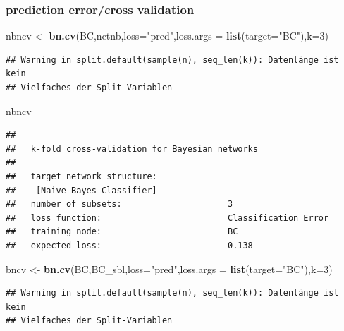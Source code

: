 \documentclass[]{article}
\newenvironment{Shaded}{\begin{snugshade}}{\end{snugshade}}
\newcommand{\KeywordTok}[1]{\textcolor[rgb]{0.13,0.29,0.53}{\textbf{{#1}}}}
\newcommand{\DataTypeTok}[1]{\textcolor[rgb]{0.13,0.29,0.53}{{#1}}}
\newcommand{\DecValTok}[1]{\textcolor[rgb]{0.00,0.00,0.81}{{#1}}}
\newcommand{\StringTok}[1]{\textcolor[rgb]{0.31,0.60,0.02}{{#1}}}
\newcommand{\NormalTok}[1]{{#1}}
\begin{document}
\subsubsection{prediction error/cross
validation}\label{prediction-errorcross-validation}

\begin{Shaded}
\begin{Highlighting}[]
\NormalTok{nbncv <-}\StringTok{ }\KeywordTok{bn.cv}\NormalTok{(BC,netnb,}\DataTypeTok{loss=}\StringTok{"pred"}\NormalTok{,}\DataTypeTok{loss.args =} \KeywordTok{list}\NormalTok{(}\DataTypeTok{target=}\StringTok{"BC"}\NormalTok{),}\DataTypeTok{k=}\DecValTok{3}\NormalTok{)}
\end{Highlighting}
\end{Shaded}

\begin{verbatim}
## Warning in split.default(sample(n), seq_len(k)): Datenlänge ist kein
## Vielfaches der Split-Variablen
\end{verbatim}

\begin{Shaded}
\begin{Highlighting}[]
\NormalTok{nbncv}
\end{Highlighting}
\end{Shaded}

\begin{verbatim}
## 
##   k-fold cross-validation for Bayesian networks
## 
##   target network structure:
##    [Naive Bayes Classifier]
##   number of subsets:                     3 
##   loss function:                         Classification Error 
##   training node:                         BC 
##   expected loss:                         0.138
\end{verbatim}

\begin{Shaded}
\begin{Highlighting}[]
\NormalTok{bncv <-}\StringTok{ }\KeywordTok{bn.cv}\NormalTok{(BC,BC_sbl,}\DataTypeTok{loss=}\StringTok{"pred"}\NormalTok{,}\DataTypeTok{loss.args =} \KeywordTok{list}\NormalTok{(}\DataTypeTok{target=}\StringTok{"BC"}\NormalTok{),}\DataTypeTok{k=}\DecValTok{3}\NormalTok{)}
\end{Highlighting}
\end{Shaded}

\begin{verbatim}
## Warning in split.default(sample(n), seq_len(k)): Datenlänge ist kein
## Vielfaches der Split-Variablen
\end{verbatim}
\end{document}
